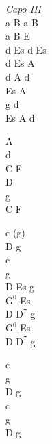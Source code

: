\begin{chord}
    \textit{Capo III}\\
    a B a B\\
    a B E\\
    d Es d Es\\
    d Es A\\
    d A d\\
    Es A\\
    g d\\
    Es A d

    A\\
    d\\
    C F\\
    D\\
    g\\
    C F

    c (g)\\
    D g\\
    c\\
    g\\
    D Es g\\
    $\mathrm{G^{0}}$ Es\\
    D $\mathrm{D^{7}}$ g\\
    $\mathrm{G^{0}}$ Es\\
    D $\mathrm{D^{7}}$ g

    c\\
    g\\
    D g\\
    c\\
    g\\
    D g
\end{chord}

